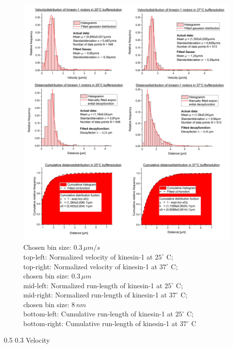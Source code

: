 \documentclass[english, %
parskip=full, %
bibliography=totoc, %
]{scrartcl}
\makeatletter
\renewcommand\subsection{\@startsection 
   {subsection}{2}{0mm}%
   {0.5\baselineskip}%
   {0.3\baselineskip}%
   {\bfseries\sffamily\large}%
   }
\makeatother
\begin{document}
\begin{figure}[htp] 
  \centering
     \includegraphics[width=1.0\textwidth]{all_diagrams.png}
  \caption{Chosen bin size: 0.3\,$\mu m/s$\\
	top-left: Normalized velocity of kinesin-1 at $25^\circ$ C; \\
	top-right: Normalized velocity of kinesin-1 at $37^\circ$ C; \\
	chosen bin size: 0.3\,$\mu m$ \\
	mid-left: Normalized run-length of kinesin-1 at $25^\circ$ C; \\
	mid-right: Normalized run-length of kinesin-1 at $37^\circ$ C; \\
	chosen bin size: 8\,$nm$ \\
	bottom-left: Cumulative run-length of kinesin-1 at $25^\circ$ C;\\
	bottom-right: Cumulative run-length of kinesin-1 at $37^\circ$ C}
  \label{fig:diagrams}
\end{figure}

\subsection{Velocity}
\end{document}
